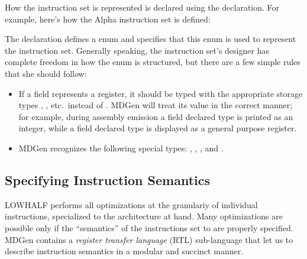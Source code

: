 How the instruction set is represented is declared using the
 declaration.  For example, here's how the Alpha instruction
set is defined:

The  declaration defines a enum and specifies
that this enum is used to represent the instruction set.  Generally
speaking, the instruction set's designer has complete freedom in how the
enum is structured, but there are a few simple rules that she should
follow:
\begin{itemize}
  \item If a field represents a register, it should be typed
with the appropriate storage types , 
, etc.~instead 
of .   MDGen will treat its value in the correct manner; for
example, during assembly emission a field declared type  is
printed as an integer, while a field declared type  is displayed
as a general purpose register.
  \item MDGen recognizes the following special 
types: , , , and .
\end{itemize}

\subsection{Specifying Instruction Semantics}
   LOWHALF performs all optimizations at 
the granulariy of individual instructions,
specialized to the architecture at hand.  Many
optimizations are possible only if the ``semantics'' of the 
instructions set to are properly specified.  MDGen contains a 
\emph{register transfer language} (RTL) sub-language that let us to describe
instruction semantics in a modular and succinct manner.  
 
